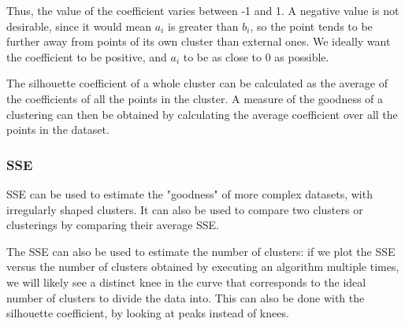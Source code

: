 Thus, the value of the coefficient varies between -1 and 1. A negative value is not desirable, since it would mean $a_i$ is greater than $b_i$, so the point tends to be further away from points of its own cluster than external ones. We ideally want the coefficient to be positive, and $a_i$ to be as close to 0 as possible.

The silhouette coefficient of a whole cluster can be calculated as the average of the coefficients of all the points in the cluster. A measure of the goodness of a clustering can then be obtained by calculating the average coefficient over all the points in the dataset.

\subsubsection{SSE}

SSE can be used to estimate the "goodness" of more complex datasets, with irregularly shaped clusters. It can also be used to compare two clusters or clusterings by comparing their average SSE.

The SSE can also be used to estimate the number of clusters: if we plot the SSE versus the number of clusters obtained by executing an algorithm multiple times, we will likely see a distinct knee in the curve that corresponds to the ideal number of clusters to divide the data into. This can also be done with the silhouette coefficient, by looking at peaks instead of knees.